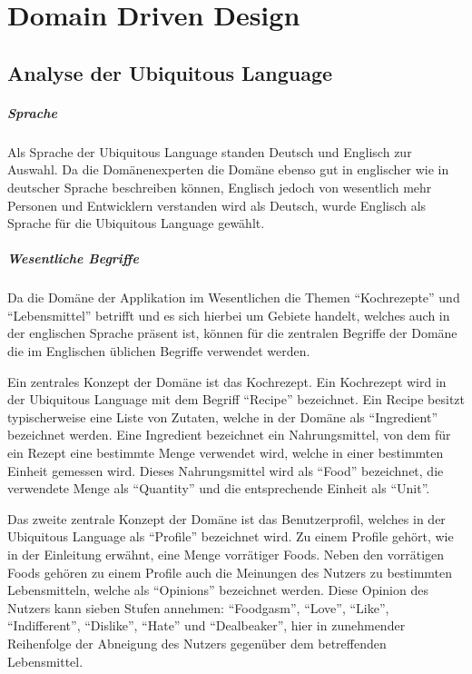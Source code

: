 \chapter{Domain Driven Design}

\section{Analyse der Ubiquitous Language}

\paragraph{Sprache} Als Sprache der Ubiquitous Language standen Deutsch und Englisch zur Auswahl. Da die Domänenexperten die Domäne ebenso gut in englischer wie in deutscher Sprache beschreiben können, Englisch jedoch von wesentlich mehr Personen und Entwicklern verstanden wird als Deutsch, wurde Englisch als Sprache für die Ubiquitous Language gewählt.

\paragraph{Wesentliche Begriffe} Da die Domäne der Applikation im Wesentlichen die Themen \enquote{Kochrezepte} und \enquote{Lebensmittel} betrifft und es sich hierbei um Gebiete handelt, welches auch in der englischen Sprache präsent ist, können für die zentralen Begriffe der Domäne die im Englischen üblichen Begriffe verwendet werden. 

Ein zentrales Konzept der Domäne ist das Kochrezept. Ein Kochrezept wird in der Ubiquitous Language mit dem Begriff \enquote{Recipe} bezeichnet. Ein Recipe besitzt typischerweise eine Liste von Zutaten, welche in der Domäne als \enquote{Ingredient} bezeichnet werden. Eine Ingredient bezeichnet ein Nahrungsmittel, von dem für ein Rezept eine bestimmte Menge verwendet wird, welche in einer bestimmten Einheit gemessen wird. Dieses Nahrungsmittel wird als \enquote{Food} bezeichnet, die verwendete Menge als \enquote{Quantity} und die entsprechende Einheit als \enquote{Unit}.

Das zweite zentrale Konzept der Domäne ist das Benutzerprofil, welches in der Ubiquitous Language als \enquote{Profile} bezeichnet wird. Zu einem Profile gehört, wie in der Einleitung erwähnt, eine Menge vorrätiger Foods. Neben den vorrätigen Foods gehören zu einem Profile auch die Meinungen des Nutzers zu bestimmten Lebensmitteln, welche als \enquote{Opinions} bezeichnet werden. Diese Opinion des Nutzers kann sieben Stufen annehmen: \enquote{Foodgasm}, \enquote{Love}, \enquote{Like}, \enquote{Indifferent}, \enquote{Dislike}, \enquote{Hate} und \enquote{Dealbeaker}, hier in zunehmender Reihenfolge der Abneigung des Nutzers gegenüber dem betreffenden Lebensmittel.

